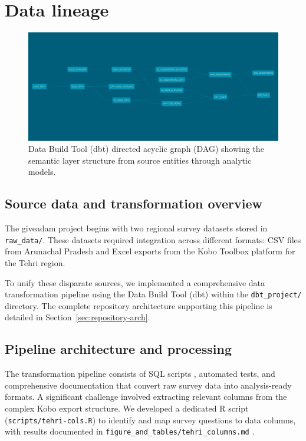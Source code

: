 \section{Data lineage}
\label{app:data-lineage}

\begin{figure}[ht]
\centering
\includegraphics[width=\textwidth]{img/dbt-dag.png}
\caption[Data lineage]{Data Build Tool (dbt) directed acyclic graph (DAG) showing the semantic layer structure from source entities through analytic models.}
\label{fig:dbtdag}
\end{figure}

\subsection{Source data and transformation overview}

The giveadam project begins with two regional survey datasets stored in \texttt{raw\_data/}. These datasets required integration across different formats: CSV files \cite{csv_rfc} from Arunachal Pradesh and Excel exports from the Kobo Toolbox \cite{kobo_toolbox} platform for the Tehri region. 

To unify these disparate sources, we implemented a comprehensive data transformation pipeline using the Data Build Tool (dbt) \cite{dbt_core,dbt_duckdb} within the \texttt{dbt\_project/} directory. The complete repository architecture supporting this pipeline is detailed in Section~\ref{sec:repository-arch}.

\subsection{Pipeline architecture and processing}

The transformation pipeline consists of SQL scripts \cite{sql}, automated tests, and comprehensive documentation that convert raw survey data into analysis-ready formats. A significant challenge involved extracting relevant columns from the complex Kobo export structure. We developed a dedicated R script \cite{r_core,tidyverse} (\texttt{scripts/tehri-cols.R}) to identify and map survey questions to data columns, with results documented in \texttt{figure\_and\_tables/tehri\_columns.md} \cite{markdown}.

